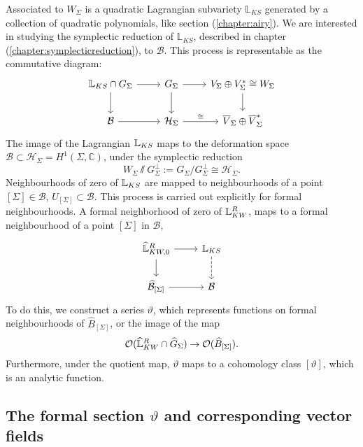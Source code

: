     Associated to \(W_\Sigma\) is a quadratic Lagrangian subvariety \( \mathbb{L}_{KS}\) generated by a collection of quadratic polynomials, like section (\ref{chapter:airy}). We are interested in studying the symplectic reduction of \( \mathbb{L}_{KS}\), described in chapter (\ref{chapter:symplecticreduction}), to \( \mathcal{B}\). This process is representable as the commutative diagram:
    \begin{equation}  
    \label{eqn:lagmap}
    \begin{tikzcd}
    \cL_{KS}\cap  G_{\Sigma} \arrow[r] \arrow[d] &  G_{\Sigma} \arrow[r] \arrow[d] &  V_\Sigma \oplus V_\Sigma^*\cong W_\Sigma \arrow[d] \\
   \mathcal{B} \arrow[r] & \mathcal{H}_\Sigma \arrow[r,"\cong"]  &\overline{V}_\Sigma\oplus \overline{V}_\Sigma^*
    \end{tikzcd}
    \end{equation}
    The image of the Lagrangian \( \mathbb{L}_{KS} \) maps to the deformation space \( \mathcal{B} \subset \mathcal{H}_\Sigma = H^1(\Sigma, \mathbb{C})\), under the symplectic reduction
    \[ W_\Sigma \sslash G_\Sigma^\perp:=G_\Sigma/G_\Sigma^\perp \cong \mathcal{H}_\Sigma.\]
    Neighbourhoods of zero of \( \mathbb{L}_{KS}\) are mapped to neighbourhoods of a point \([\Sigma]\in \mathcal{B}\), \( U_{[\Sigma]} \subset \mathcal{B}\). This process is carried out explicitly for formal neighbourhoods. A formal neighborhood of zero of  \(\mathbb{L}_{KW}^R\), maps to a formal neighbourhood of a point \( [\Sigma]\) in \( \mathcal{B}\),
    \begin{equation*}
        \begin{tikzcd}
            \widehat{\cL}_{KW,0}^R \arrow[d] \arrow[r] & \cL_{KS} \arrow[d,dashed]   \\ 
            \widehat{\mathcal{B}}_{[\Sigma]} \arrow[r] & \mathcal{B}
        \end{tikzcd}
    \end{equation*}
    To do this, we construct a series \( \vartheta\), which represents functions on formal neighbourhoods of \(  \widehat{B}_{[\Sigma]}\), or the image of the map 
    \[\mathcal{O}( \widehat{\mathbb{L}}_{KW}^R \cap \widehat{G}_\Sigma) \rightarrow  \mathcal{O}( \widehat{B}_{[\Sigma]} ).\]
    Furthermore, under the quotient map, \(\vartheta\) maps to a cohomology class \([\vartheta]\), which is an analytic function.
    
    \subsection{The formal section \texorpdfstring{\( \vartheta\)}{theta} and corresponding vector fields}
    \label{sec:vartheta} 
    
